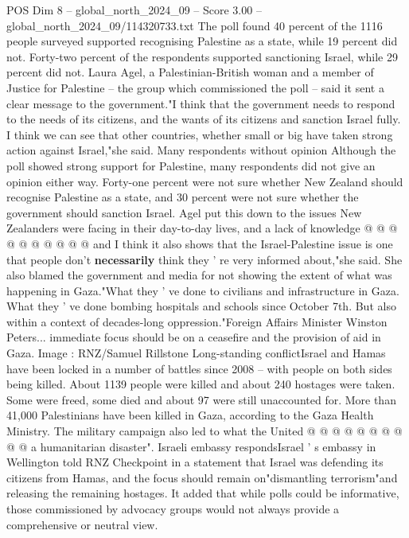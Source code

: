 \begin{textsample}{POS Dim 8 – global\_north\_2024\_09 – Score 3.00 – global\_north\_2024\_09/114320733.txt}  \label{ex:f8_pos_295}
The poll found 40 percent of the 1116 people surveyed supported recognising Palestine as a state, while 19 percent did not.
Forty-two percent of the respondents supported sanctioning Israel, while 29 percent did not.
Laura Agel, a Palestinian-British woman and a member of Justice for Palestine -- the group which commissioned the poll -- said it sent a clear message to the government."I think that the government needs to respond to the needs of its citizens, and the wants of its citizens and sanction Israel fully.
I think we can see that other countries, whether small or big have taken strong action against Israel,"she said.
Many respondents without opinion Although the poll showed strong support for Palestine, many respondents did not give an opinion either way.
Forty-one percent were not sure whether New Zealand should recognise Palestine as a state, and 30 percent were not sure whether the government should sanction Israel.
Agel put this down to the issues New Zealanders were facing in their day-to-day lives, and a lack of knowledge @ @ @ @ @ @ @ @ @ @ and I think it also shows that the Israel-Palestine issue is one that people don't \textbf{necessarily} think they ' re very informed about,"she said.
She also blamed the government and media for not showing the extent of what was happening in Gaza."What they ' ve done to civilians and infrastructure in Gaza.
What they ' ve done bombing hospitals and schools since October 7th.
But also within a context of decades-long oppression."Foreign Affairs Minister Winston Peters... immediate focus should be on a ceasefire and the provision of aid in Gaza.
Image : RNZ/Samuel Rillstone Long-standing conflictIsrael and Hamas have been locked in a number of battles since 2008 -- with people on both sides being killed.
About 1139 people were killed and about 240 hostages were taken.
Some were freed, some died and about 97 were still unaccounted for.
More than 41,000 Palestinians have been killed in Gaza, according to the Gaza Health Ministry.
The military campaign also led to what the United @ @ @ @ @ @ @ @ @ @ a humanitarian disaster".
Israeli embassy respondsIsrael ' s embassy in Wellington told RNZ Checkpoint in a statement that Israel was defending its citizens from Hamas, and the focus should remain on"dismantling terrorism"and releasing the remaining hostages.
It added that while polls could be informative, those commissioned by advocacy groups would not always provide a comprehensive or neutral view.

\end{textsample}
